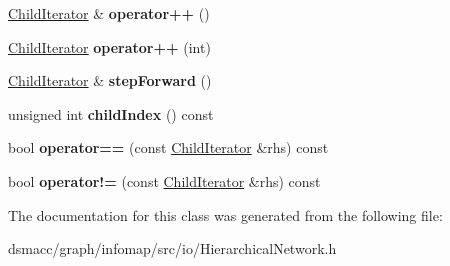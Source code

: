 \begin{DoxyCompactItemize}
\mbox{\hyperlink{classChildIterator}{Child\+Iterator}} \& {\bfseries operator++} ()
\item 
\mbox{\label{classChildIterator_a1c8b764adef70bced0d738e02d81470a}} 
\mbox{\hyperlink{classChildIterator}{Child\+Iterator}} {\bfseries operator++} (int)
\item 
\mbox{\label{classChildIterator_aecbc1465c559ac34cd70f2c07f8ab64b}} 
\mbox{\hyperlink{classChildIterator}{Child\+Iterator}} \& {\bfseries step\+Forward} ()
\item 
\mbox{\label{classChildIterator_a41c9dc431dafd99d1d546cae7fc71919}} 
unsigned int {\bfseries child\+Index} () const
\item 
\mbox{\label{classChildIterator_ad24dd7ee310ab12d89740c311cc6ff56}} 
bool {\bfseries operator==} (const \mbox{\hyperlink{classChildIterator}{Child\+Iterator}} \&rhs) const
\item 
\mbox{\label{classChildIterator_a23ba82187b208ab751c7e9086df50609}} 
bool {\bfseries operator!=} (const \mbox{\hyperlink{classChildIterator}{Child\+Iterator}} \&rhs) const
\end{DoxyCompactItemize}


The documentation for this class was generated from the following file\+:\begin{DoxyCompactItemize}
\item 
dsmacc/graph/infomap/src/io/Hierarchical\+Network.\+h\end{DoxyCompactItemize}
